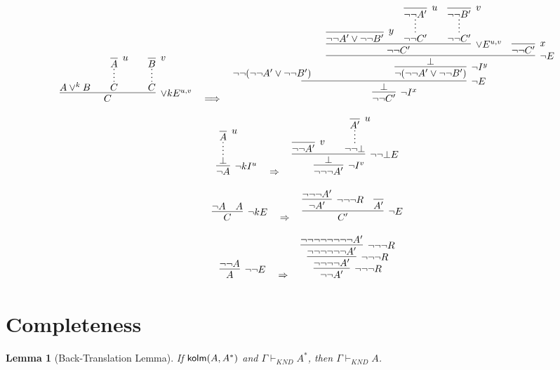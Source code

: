\documentclass{article}
\newtheorem{lemma}{Lemma}
\begin{document}
\vspace{3em}
\[
\infer[\lor kE^{u,v}]{C}{
    A \lor^k B
    \hspace{2em}
    \infer*[]{C}{\infer[u]{A}{}}
    \hspace{2em}
    \infer*[]{C}{\infer[v]{B}{}}
}
\quad\Longrightarrow\quad
\infer[\neg I^x]{\neg\neg C'}{
  \infer[\neg E]{\perp}{
    \neg\neg (\neg\neg A' \lor \neg\neg B') \hspace{1.5em}
    \infer[\neg I^y]{\neg (\neg\neg A' \lor \neg\neg B')}{
      \infer[\neg E]{\perp}{
        \infer[\lor E^{u,v}]{\neg\neg C'}{
          {\infer[y]{\neg\neg A' \lor \neg\neg B'}{}} \hspace{1em}
          \infer*[]{\neg\neg C'}{\infer[u]{\neg\neg A'}{}}
          \hspace{1em}
          \infer*[]{\neg\neg C'}{\infer[v]{\neg\neg B'}{}}
        }
        \hspace{1em}
        {\infer[x]{\neg\neg C'}{}}
      }
    }
  }
}
\]

\vspace{3em}
\[
\infer[\neg kI^u]{\neg A}{
  \infer*[]{\bot}{\infer[u]{A}{}}
}
\quad \Rightarrow \quad
\infer[\neg I^v]{\neg\neg\neg A'}{
  \infer[\neg\neg\bot E]{\bot}{
    \infer[v]{\neg\neg A'}{}
    \hspace{2em}
    \infer*[]{\neg\neg\bot}{\infer[u]{A'}{}}
  }
}
\]

\vspace{3em}
\[
\infer[\neg kE]{C}{
  \neg A \quad A
}
\quad \Rightarrow \quad
\infer[\neg E]{C'}{
    \infer[\neg\neg\neg R]{\neg A'}{
      \neg\neg\neg A'
    }
  \quad
  \infer{A'}{}
}
\]



\vspace{3em}
\[
\infer[\neg\neg E]{A}{
    \neg\neg A
}
\quad \Rightarrow \quad
\infer[\neg\neg\neg R]{
  \neg\neg A'
}{
  \infer[\neg\neg\neg R]{
    \neg\neg\neg\neg A'
  }{
    \infer[\neg\neg\neg R]{
      \neg\neg\neg\neg\neg\neg A'
    }{
      \neg\neg\neg\neg\neg\neg\neg\neg A'
    }
  }
}
\]











\section{Completeness}
    \begin{lemma}[Back-Translation Lemma]
    If \(\mathsf{kolm}(A, A^*)\) and \(\Gamma \vdash_{\textit{KND}} A^*\), then \(\Gamma \vdash_{\textit{KND}} A\).
    \end{lemma}
    
\end{document}
